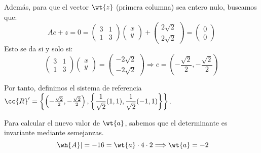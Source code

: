 \begin{ejercicio}
\begin{enumerate}
        Además, para que el vector $\wt{z}$ (primera columna) sea entero nulo, buscamos que:
        \begin{equation*}
            Ac + z = 0
            =  \left(\begin{array}{cc}
                3 & 1 \\
                1 & 3
            \end{array}\right)\left(\begin{array}{c}
                x\\y
            \end{array}\right) + \left(\begin{array}{c}
                2\sqrt{2} \\ 2\sqrt{2}
            \end{array}\right) = \left(\begin{array}{c}
                0\\0
            \end{array}\right)
        \end{equation*}
        Esto se da si y solo si:
        \begin{equation*}
            \left(\begin{array}{cc}
                3 & 1 \\
                1 & 3
            \end{array}\right)\left(\begin{array}{c}
                x\\y
            \end{array}\right) = \left(\begin{array}{c}
                -2\sqrt{2} \\ -2\sqrt{2}
            \end{array}\right) \Longrightarrow c=\left(-\frac{\sqrt{2}}{2},-\frac{\sqrt{2}}{2}\right)
        \end{equation*}

        Por tanto, definimos el sistema de referencia $\cc{R}'=\left\{\left(-\frac{\sqrt{2}}{2},-\frac{\sqrt{2}}{2}\right), \left\{\dfrac{1}{\sqrt{2}}(1,1), \dfrac{1}{\sqrt{2}}(-1,1)\right\}\right\}$.

        Para calcular el nuevo valor de $\wt{a}$, sabemos que el determinante es invariante mediante semejanzas.
        \begin{equation*}
            |\wh{A}|=-16= \wt{a}\cdot 4\cdot 2\Longrightarrow \wt{a}=-2
        \end{equation*}
        

\end{enumerate}
\end{ejercicio}
